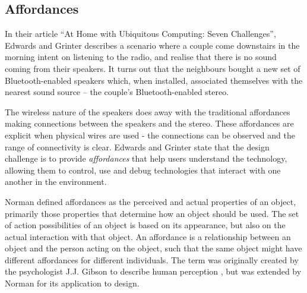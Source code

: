 % 


\subsection{Affordances}

In their article ``At Home with Ubiquitous Computing: Seven Challenges'', Edwards and Grinter \cite{Edwards2001} describes a scenario where a couple come downstairs in the morning intent on listening to the radio, and realise that there is no sound coming from their speakers. It turns out that the neighbours bought a new set of Bluetooth-enabled speakers which, when installed, associated themselves with the nearest sound source -- the couple's Bluetooth-enabled stereo.

The wireless nature of the speakers does away with the traditional affordances making connections between the speakers and the stereo. These affordances are explicit when physical wires are used - the connections can be observed and the range of connectivity is clear. Edwards and Grinter state that the design challenge is to provide \emph{affordances}\label{Affordances} that help users understand the technology, allowing them to control, use and debug technologies that interact with one another in the environment. 

Norman \cite{Norman1999} defined affordances as the perceived and actual properties of an object, primarily those properties that determine how an object should be used. The set of action possibilities of an object is based on its appearance, but also on the actual interaction with that object. An affordance is a relationship between an object and the person acting on the object, such that the same object might have different affordances for different individuals. The term was originally created by the psychologist J.J. Gibson to describe human perception \cite{Gibson1977}, but was extended by Norman for its application to design.



